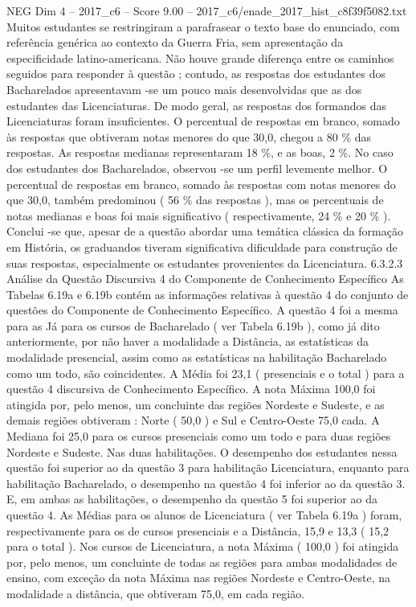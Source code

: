 \begin{textsample}{NEG Dim 4 – 2017\_c6 – Score 9.00 – 2017\_c6/enade\_2017\_hist\_c8f39f5082.txt}
Muitos estudantes se restringiram a parafrasear o texto base do enunciado, com referência genérica ao contexto da Guerra Fria, sem apresentação da especificidade latino-americana.
Não houve grande diferença entre os caminhos seguidos para responder à questão ; contudo, as respostas dos estudantes dos Bacharelados apresentavam -se um pouco mais desenvolvidas que as dos estudantes das Licenciaturas.
De modo geral, as respostas dos formandos das Licenciaturas foram insuficientes.
O percentual de respostas em branco, somado às respostas que obtiveram notas menores do que 30,0, chegou a 80 \% das respostas.
As respostas medianas representaram 18 \%, e as boas, 2 \%.
No caso dos estudantes dos Bacharelados, observou -se um perfil levemente melhor.
O percentual de respostas em branco, somado às respostas com notas menores do que 30,0, também predominou ( 56 \% das respostas ), mas os percentuais de notas medianas e boas foi mais significativo ( respectivamente, 24 \% e 20 \% ).
Conclui -se que, apesar de a questão abordar uma temática clássica da formação em História, os graduandos tiveram significativa dificuldade para construção de suas respostas, especialmente os estudantes provenientes da Licenciatura. 6.3.2.3 Análise da Questão Discursiva 4 do Componente de Conhecimento Específico As Tabelas 6.19a e 6.19b contém as informações relativas à questão 4 do conjunto de questões do Componente de Conhecimento Específico.
A questão 4 foi a mesma para as Já para os cursos de Bacharelado ( ver Tabela 6.19b ), como já dito anteriormente, por não haver a modalidade a Distância, as estatísticas da modalidade presencial, assim como as estatísticas na habilitação Bacharelado como um todo, são coincidentes.
A Média foi 23,1 ( presenciais e o total ) para a questão 4 discursiva de Conhecimento Específico.
A nota Máxima 100,0 foi atingida por, pelo menos, um concluinte das regiões Nordeste e Sudeste, e as demais regiões obtiveram : Norte ( 50,0 ) e Sul e Centro-Oeste 75,0 cada.
A Mediana foi 25,0 para os cursos presenciais como um todo e para duas regiões Nordeste e Sudeste.
Nas duas habilitações.
O desempenho dos estudantes nessa questão foi superior ao da questão 3 para habilitação Licenciatura, enquanto para habilitação Bacharelado, o desempenho na questão 4 foi inferior ao da questão 3.
E, em ambas as habilitações, o desempenho da questão 5 foi superior ao da questão 4.
As Médias para os alunos de Licenciatura ( ver Tabela 6.19a ) foram, respectivamente para os de cursos presenciais e a Distância, 15,9 e 13,3 ( 15,2 para o total ).
Nos cursos de Licenciatura, a nota Máxima ( 100,0 ) foi atingida por, pelo menos, um concluinte de todas as regiões para ambas modalidades de ensino, com exceção da nota Máxima nas regiões Nordeste e Centro-Oeste, na modalidade a distância, que obtiveram 75,0, em cada região.

\end{textsample}
